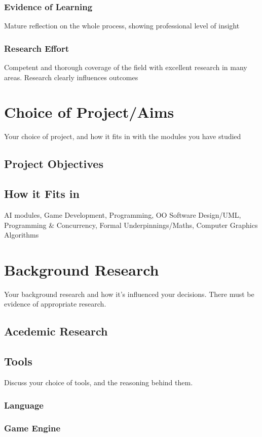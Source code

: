 \documentclass[runningheads,a4paper]{llncs}
\begin{document}
	\subsubsection{Evidence of Learning}
	Mature reflection on the whole process, showing professional level of insight
	
	\subsubsection{Research Effort}
	Competent and thorough coverage of the field with excellent research in many areas. Research clearly influences outcomes   

\section{Choice of Project/Aims}
Your choice of project, and how it fits in with the modules you have studied
	\subsection{Project Objectives}
	\subsection{How it Fits in}
		AI modules, Game Development, Programming, OO Software Design/UML, Programming & Concurrency, Formal Underpinnings/Maths, Computer Graphics Algorithms

\section{Background Research}
Your background research and how it's influenced your decisions. There must be evidence of appropriate research.

	\subsection{Acedemic Research}
	
	\subsection{Tools}
	Discuss your choice of tools, and the reasoning behind them.

		\subsubsection{Language}
		\subsubsection{Game Engine}
\end{document}
